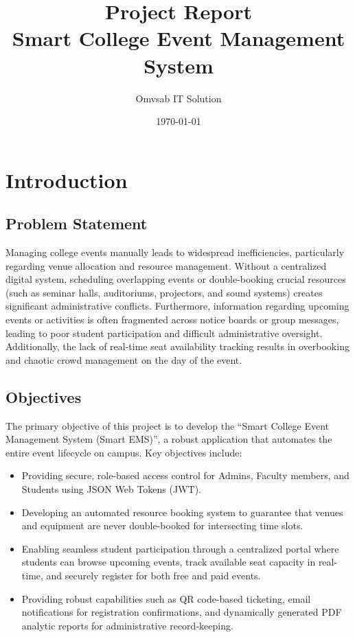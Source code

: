\documentclass[12pt, a4paper]{report}
\title{\textbf{Project Report}\\Smart College Event Management System}
\author{Omvsab IT Solution}
\date{\today}
\begin{document}
\maketitle

\tableofcontents
\newpage

\chapter{Introduction}

\section{Problem Statement}
Managing college events manually leads to widespread inefficiencies, particularly regarding venue allocation and resource management. Without a centralized digital system, scheduling overlapping events or double-booking crucial resources (such as seminar halls, auditoriums, projectors, and sound systems) creates significant administrative conflicts. Furthermore, information regarding upcoming events or activities is often fragmented across notice boards or group messages, leading to poor student participation and difficult administrative oversight. Additionally, the lack of real-time seat availability tracking results in overbooking and chaotic crowd management on the day of the event.

\section{Objectives}
The primary objective of this project is to develop the ``Smart College Event Management System (Smart EMS)'', a robust application that automates the entire event lifecycle on campus. Key objectives include:
\begin{itemize}
    \item Providing secure, role-based access control for Admins, Faculty members, and Students using JSON Web Tokens (JWT).
    \item Developing an automated resource booking system to guarantee that venues and equipment are never double-booked for intersecting time slots.
    \item Enabling seamless student participation through a centralized portal where students can browse upcoming events, track available seat capacity in real-time, and securely register for both free and paid events.
    \item Providing robust capabilities such as QR code-based ticketing, email notifications for registration confirmations, and dynamically generated PDF analytic reports for administrative record-keeping.
\end{itemize}
\end{document}
